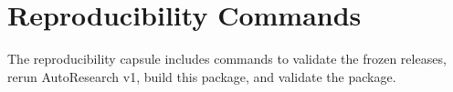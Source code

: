 \section{Reproducibility Commands}
The reproducibility capsule includes commands to validate the frozen releases, rerun AutoResearch v1, build this package, and validate the package.

